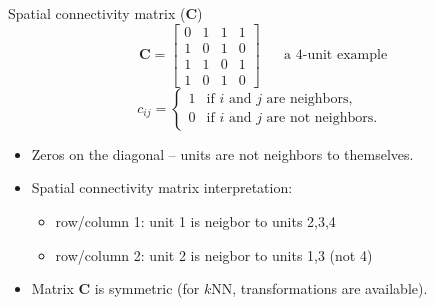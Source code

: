 \documentclass{beamer}
\begin{document}
\begin{frame}{Spatial connectivity matrix ($\bm{C}$)}
$$
~~\bm{C} = \begin{bmatrix}
0 & 1 & 1 & 1 \\
1 & 0 & 1 & 0 \\
1 & 1 & 0 & 1 \\
1 & 0 & 1 & 0
\end{bmatrix}\quad \text{~~a 4-unit example}$$
$$c_{ij}=
	\begin{cases}
	1 & \text{if $i$ and $j$ are neighbors,}\\
	0 & \text{if $i$ and $j$ are not neighbors.}
	\end{cases}$$
\begin{itemize}
	\item Zeros on the diagonal -- units are not neighbors to themselves.
	\smallskip
	\item Spatial connectivity matrix interpretation: 
	\smallskip
	\begin{itemize}
		\item row/column 1: unit 1 is neigbor to units 2,3,4
		\item row/column 2: unit 2 is neigbor to units 1,3 (not 4)
	\end{itemize}
	\smallskip
    \item Matrix $\bm{C}$ is symmetric (for $k$NN, transformations are available).
\end{itemize}
\end{frame}
\end{document}
